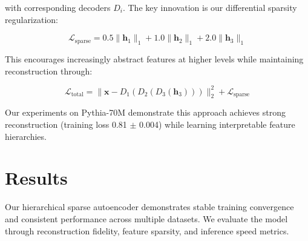 with corresponding decoders $D_i$. The key innovation is our differential sparsity regularization:

\begin{equation}
\mathcal{L}_\text{sparse} = 0.5\|\mathbf{h}_1\|_1 + 1.0\|\mathbf{h}_2\|_1 + 2.0\|\mathbf{h}_3\|_1
\end{equation}

This encourages increasingly abstract features at higher levels while maintaining reconstruction through:

\begin{equation}
\mathcal{L}_\text{total} = \|\mathbf{x} - D_1(D_2(D_3(\mathbf{h}_3)))\|_2^2 + \mathcal{L}_\text{sparse}
\end{equation}

Our experiments on Pythia-70M demonstrate this approach achieves strong reconstruction (training loss 0.81 $\pm$ 0.004) while learning interpretable feature hierarchies.

\section{Results}

Our hierarchical sparse autoencoder demonstrates stable training convergence and consistent performance across multiple datasets. We evaluate the model through reconstruction fidelity, feature sparsity, and inference speed metrics.

